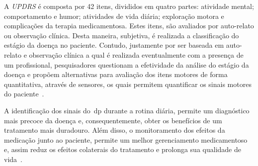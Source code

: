 A \textit{UPDRS} é composta por 42 itens, divididos em quatro partes: atividade mental; comportamento e humor; atividades de vida diária; exploração motora e complicações da terapia medicamentosa. Estes itens, são avaliados por auto-relato ou observação clínica. Desta maneira, subjetiva, é realizada a classificação do estágio da doença no paciente. Contudo, justamente por ser baseada em auto-relato e observação clínica a qual é realizada eventualmente com a presença de um profissional, pesquisadores questionam a efetividade da análise do estágio da doença e propõem alternativas para avaliação dos itens motores de forma quantitativa, através de sensores, os quais permitem quantificar os sinais motores do paciente~\cite{kostek12,synnott_wiipd_2012,patel_monitoring_2009}.


A identificação dos sinais do~\ac{dp} durante a rotina diária, permite um diagnóstico mais precoce da doença e, consequentemente, obter os benefícios de um tratamento mais duradouro. Além disso, o monitoramento dos efeitos da medicação junto ao paciente, permite um melhor gerenciamento medicamentoso e, assim reduz os efeitos colaterais do tratamento e prolonga sua qualidade de vida~\cite{rowlandtratado}.


